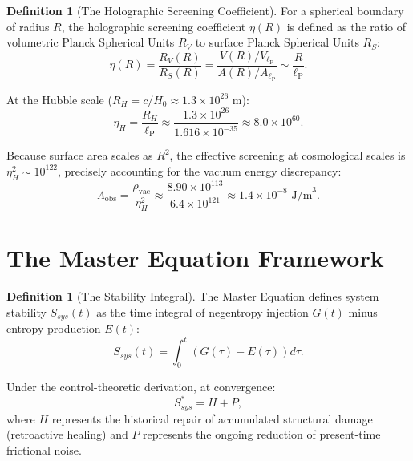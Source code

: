 \documentclass[12pt, a4paper]{article}
\theoremstyle{plain}
\theoremstyle{definition}
\newtheorem{definition}[theorem]{Definition}
\theoremstyle{remark}
\newcommand{\lP}{\ell_{\mathrm{P}}}
\begin{document}
\begin{definition}[The Holographic Screening Coefficient]
For a spherical boundary of radius $R$, the holographic screening coefficient $\eta(R)$ is defined as the ratio of volumetric Planck Spherical Units $R_V$ to surface Planck Spherical Units $R_S$:
\begin{equation}
    \eta(R) = \frac{R_V(R)}{R_S(R)} = \frac{V(R) / V_{\lP}}{A(R) / A_{\lP}} \sim \frac{R}{\lP}.
\end{equation}
\end{definition}

At the Hubble scale ($R_H = c/H_0 \approx 1.3 \times 10^{26}$ m):
\begin{equation}\label{eq:eta_hubble}
    \eta_H = \frac{R_H}{\lP} \approx \frac{1.3 \times 10^{26}}{1.616 \times 10^{-35}} \approx 8.0 \times 10^{60}.
\end{equation}

Because surface area scales as $R^2$, the effective screening at cosmological scales is $\eta_H^2 \sim 10^{122}$, precisely accounting for the vacuum energy discrepancy:
\begin{equation}\label{eq:lambda_screen}
    \Lambda_{\text{obs}} = \frac{\rho_{\text{vac}}}{\eta_H^2} \approx \frac{8.90 \times 10^{113}}{6.4 \times 10^{121}} \approx 1.4 \times 10^{-8} \text{ J/m}^3.
\end{equation}

\section{The Master Equation Framework}\label{sec:master}

\begin{definition}[The Stability Integral]
The Master Equation defines system stability $S_{sys}(t)$ as the time integral of negentropy injection $G(t)$ minus entropy production $E(t)$:
\begin{equation}\label{eq:master}
    S_{sys}(t) = \int_0^t \left(G(\tau) - E(\tau)\right) d\tau.
\end{equation}
\end{definition}

Under the control-theoretic derivation, at convergence:
\begin{equation}
    S_{sys}^* = H + P,
\end{equation}
where $H$ represents the historical repair of accumulated structural damage (retroactive healing) and $P$ represents the ongoing reduction of present-time frictional noise.
\end{document}
